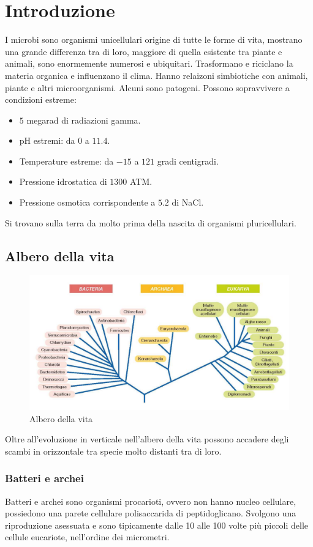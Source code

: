 \chapter{Introduzione}
I microbi sono organismi unicellulari origine di tutte le forme di vita, mostrano una grande differenza tra di loro, maggiore di quella esistente tra piante
e animali, sono enormemente numerosi e ubiquitari. Trasformano e riciclano la materia organica e influenzano il clima. Hanno relaizoni simbiotiche con 
animali, piante e altri microorganismi. Alcuni sono patogeni. Possono sopravvivere a condizioni estreme:
\begin{itemize}
\item $5$ megarad di radiazioni gamma.
\item pH estremi: da $0$ a $11.4$.
\item Temperature estreme: da $-15$ a $121$ gradi centigradi.
\item Pressione idrostatica di $1300$ ATM.
\item Pressione osmotica corrispondente a $5.2$ di NaCl.
\end{itemize}
Si trovano sulla terra da molto prima della nascita di organismi pluricellulari. 
\section{Albero della vita}
\begin{figure}[h]
\includegraphics[width=\textwidth]{Pictures/AlberoVita.png}
\caption{Albero della vita}
\end{figure}
Oltre all'evoluzione in verticale nell'albero della vita possono accadere degli scambi in orizzontale tra specie molto distanti tra di loro. 
\subsection{Batteri e archei}
Batteri e archei sono organismi procarioti, ovvero non hanno nucleo cellulare, possiedono una parete cellulare polisaccarida di peptidoglicano. Svolgono una
riproduzione asessuata e sono tipicamente dalle 10 alle 100 volte pi\`u piccoli delle cellule eucariote, nell'ordine dei micrometri. 
